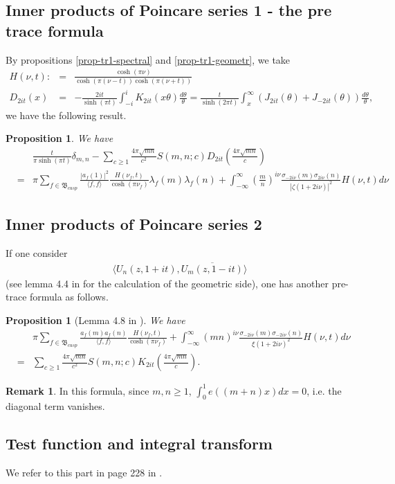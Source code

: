 \documentclass[11pt,reqno]{amsart}
\newcommand{\bna}{\begin{eqnarray*}}
\newcommand{\ena}{\end{eqnarray*}}
\newtheorem{prop}[lemma]{Proposition}
\theoremstyle{definition}
\newtheorem{remark}{Remark}
\begin{document}
\subsection{Inner products of Poincare series 1 - the pre trace formula}
By propositions \ref{prop-tr1-spectral} and \ref{prop-tr1-geometr},
we take
\bna
H(\nu,t):&=&\frac{\cosh (\pi\nu)}{\cosh(\pi(\nu-t))
\cosh(\pi(\nu+t))}\\
D_{2it}(x)&=&-\frac{2it}{\sinh(\pi t)}
\int_{-i}^i K_{2it}(x\theta)\frac{d\theta}{\theta}
=\frac{t}{\sinh(2\pi t)}\int_{x}^\infty (J_{2it}(\theta)+J_{-2it}(\theta))\frac{d\theta}{\theta},
\ena
we have the following result.
\begin{prop}\label{prop-tr1}
We have
\bna
&&
\frac{t}{\pi\sinh(\pi t)}
\delta_{m,n}
-\sum_{c\geq 1}\frac{4\pi\sqrt{mn}}{c^2}S(m,n;c)
D_{2it}\left(\frac{4\pi\sqrt{mn}}{c}\right)
\\
&=&\pi\sum_{f\in\mathfrak B_{cusp}}\frac{|a_f(1)|^2}{\langle f,f\rangle}
\frac{H(\nu_f,t)}{\cosh(\pi\nu_f)}\lambda_{f}(m)\lambda_f(n)
+\int_{-\infty}^\infty
\left(\frac{m}{n}\right)^{i\nu}
\frac{\sigma_{-2i\nu}(m)\sigma_{2i\nu}(n)}{|\zeta(1+2i\nu)|^2}
H(\nu,t)
d\nu
\ena
\end{prop}
\subsection{Inner products of Poincare series 2}
If one consider
\bna
\langle U_n(z,1+it), \overline{U_m(z,1-it)}\rangle
\ena
(see lemma 4.4 in \cite{DeIw1982} for the calculation of the geometric side), one has another pre-trace formula as follows.
\begin{prop}[Lemma 4.8 in \cite{DeIw1982}]We have
\bna
&&\pi\sum_{f\in\mathfrak B_{cusp}}
\frac{a_f(m)a_f(n)}{\langle f,f\rangle}\frac{H(\nu_f,t)}{\cosh(\pi \nu_f)}
+\int_{-\infty}^\infty(mn)^{i\nu}
\frac{\sigma_{-2i\nu}(m)\sigma_{-2i\nu}(n)}{\xi(1+2i\nu)^2}
H(\nu,t)d\nu\\
&=&\sum_{c\geq 1}\frac{4\pi\sqrt{mn}}{c^2}S(m,n;c)K_{2it}\left(\frac{4\pi\sqrt{mn}}{c}\right).
\ena
\end{prop}
\begin{remark}In this formula, since $m,n\geq 1$, $\int_0^1e((m+n)x)dx=0$, i.e. the diagonal term
vanishes.
\end{remark}

\subsection{Test function and integral transform}We refer to this part
in page 228 in \cite{DeIw1982}.
\end{document}
